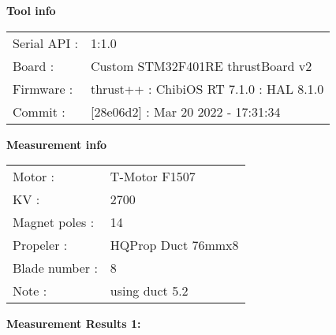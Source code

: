 \documentclass[10pt]{article}
\begin{document}
\noindent
{\large \bf Tool info}
\vspace{3mm}

\noindent
\begin{tabular}{ll}
Serial API : 	&1:1.0  \\
Board	:		&Custom STM32F401RE thrustBoard v2  \\
Firmware :		&thrust++ : ChibiOS RT 7.1.0 : HAL 8.1.0  \\
Commit :		&[28e06d2] : Mar 20 2022 - 17:31:34
\end{tabular}
\vspace{3mm}

\noindent
{\large \bf Measurement info}
\vspace{3mm}

\noindent
\begin{tabular}{ll}
Motor : 		&T-Motor F1507  \\
KV : 			&2700  \\
Magnet poles : 	&14  \\

Propeler : 		&HQProp Duct 76mmx8  \\
Blade number : 	&8  \\
Note :			&using duct 5.2
\end{tabular}

\vspace{3mm}

\noindent
{\large \bf Measurement Results 1:}
\vspace{3mm}
\end{document}
